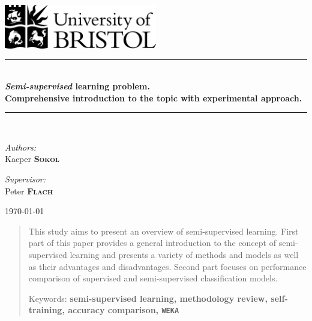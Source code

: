 \documentclass[12pt, a4paper, pdflatex]{report}
\newcommand{\HRule}{\rule{\linewidth}{0.5mm}}
\begin{document}
\begin{titlepage}
\begin{center}
\includegraphics[width=0.5\textwidth]{graphics/UOB-logo.png}~\\[4cm] %



\HRule \\[0.4cm]
{ \huge \bfseries \emph{Semi-supervised} learning problem.\\
	Comprehensive introduction to the topic with experimental approach.\\[0.4cm] }
\HRule \\[1.5cm]

\begin{minipage}{0.4\textwidth}
\begin{flushleft} \large
\emph{Authors:}\\
Kacper \textsc{\textbf{Sokol}}
\end{flushleft}
\end{minipage}
\begin{minipage}{0.4\textwidth}
\begin{flushright} \large
\emph{Supervisor:} \\
Peter \textsc{\textbf{Flach}}
\end{flushright}
\end{minipage}

\vfill

{\large \today}
\end{center}
\end{titlepage}

{

\onecolumn
}

\begin{abstract}
This study aims to present an overview of semi-supervised learning. First part of this paper provides a general introduction to the concept of semi-supervised learning and presents a variety of methods and models as well as their advantages and disadvantages. Second part focuses on performance comparison of supervised and semi-supervised classification models.
\begin{center}
Keywords: \textbf{semi-supervised learning, methodology review, self-training, accuracy comparison, \texttt{WEKA}}
\end{center}
\end{abstract}
\end{document}
